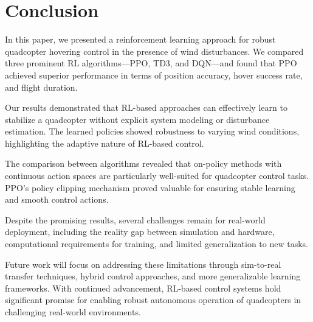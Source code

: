 \documentclass[12pt]{article}
\begin{document}
\section{Conclusion}

In this paper, we presented a reinforcement learning approach for robust quadcopter hovering control in the presence of wind disturbances. We compared three prominent RL algorithms—PPO, TD3, and DQN—and found that PPO achieved superior performance in terms of position accuracy, hover success rate, and flight duration.

Our results demonstrated that RL-based approaches can effectively learn to stabilize a quadcopter without explicit system modeling or disturbance estimation. The learned policies showed robustness to varying wind conditions, highlighting the adaptive nature of RL-based control.

The comparison between algorithms revealed that on-policy methods with continuous action spaces are particularly well-suited for quadcopter control tasks. PPO's policy clipping mechanism proved valuable for ensuring stable learning and smooth control actions.

Despite the promising results, several challenges remain for real-world deployment, including the reality gap between simulation and hardware, computational requirements for training, and limited generalization to new tasks.

Future work will focus on addressing these limitations through sim-to-real transfer techniques, hybrid control approaches, and more generalizable learning frameworks. With continued advancement, RL-based control systems hold significant promise for enabling robust autonomous operation of quadcopters in challenging real-world environments.
\end{document}
